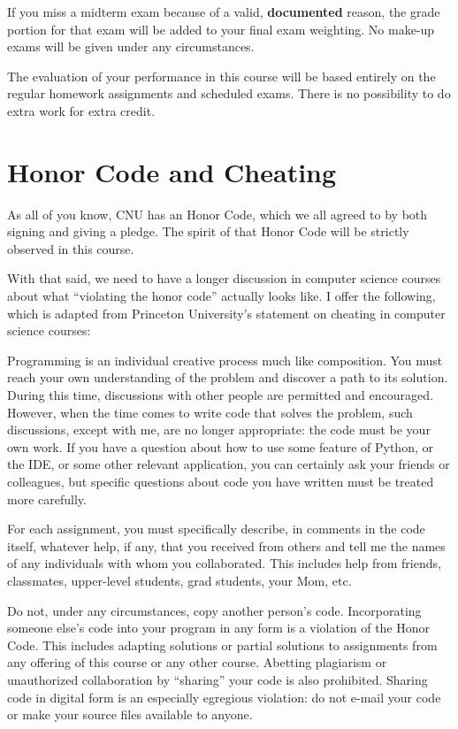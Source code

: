\documentclass[11pt]{article}
\begin{document}
If you miss a midterm exam because of a valid, \textbf{documented} reason, the grade portion for that exam will be added to your final exam weighting. No make-up exams will be given under any circumstances.

The evaluation of your performance in this course will be based entirely on the regular homework assignments and scheduled exams. There is no possibility to do extra work for extra credit.

\section{Honor Code and Cheating}

As all of you know, CNU has an Honor Code, which we all agreed to by both signing and giving a pledge. The spirit of that Honor Code will be strictly observed in this course.

With that said, we need to have a longer discussion in computer science courses about what ``violating the honor code'' actually looks like. I offer the following, which is adapted from Princeton University's statement on cheating in computer science courses:

Programming is an individual creative process much like composition. You must reach your own understanding of the problem and discover a path to its solution. During this time, discussions with other people are permitted and encouraged. However, when the time comes to write code that solves the problem, such discussions, except with me, are no longer appropriate: the code must be your own work. If you have a question about how to use some feature of Python, or the IDE, or some other relevant application, you can certainly ask your friends or colleagues, but specific questions about code you have written must be treated more carefully.

For each assignment, you must specifically describe, in comments in the code itself, whatever help, if any, that you received from others and tell me the names of any individuals with whom you collaborated. This includes help from friends, classmates, upper-level students, grad students, your Mom, etc.

Do not, under any circumstances, copy another person's code. Incorporating someone else's code into your program in any form is a violation of the Honor Code. This includes adapting solutions or partial solutions to assignments from any offering of this course or any other course. Abetting plagiarism or unauthorized collaboration by ``sharing'' your code is also prohibited. Sharing code in digital form is an especially egregious violation: do not e-mail your code or make your source files available to anyone.
\end{document}
